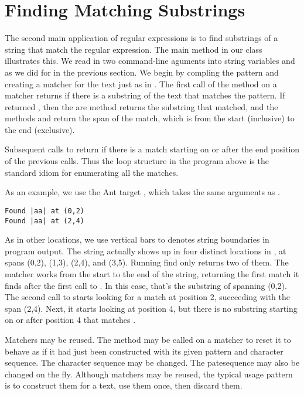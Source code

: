 \section{Finding Matching Substrings}

The second main application of regular expressions is to find
substrings of a string that match the regular expression.  The main
method in our class  illustrates this.  We read in two
command-line aguments into string variables  and 
as we did for  in the previous section.  We begin
by compling the pattern and creating a matcher for the text just
as in .
%
%
The first call of the  method on a matcher returns
 if there is a substring of the text that matches the
pattern.  If  returned , then the are method
 returns the substring that matched, and the methods
 and  return the span of the match, which is
from the start (inclusive) to the end (exclusive).

Subsequent calls to  return  if there is a
match starting on or after the end position of the previous calls.
Thus the loop structure in the program above is the standard idiom
for enumerating all the matches.  

As an example, we use the Ant target , which takes
the same arguments as .
%
%
\begin{verbatim}
Found |aa| at (0,2)
Found |aa| at (2,4)
\end{verbatim}
%
As in other locations, we use vertical bars to denotes string
boundaries in program output.  The string  actually
shows up in four distinct locations in , at
spans (0,2), (1,3), (2,4), and (3,5).  Running find only returns two
of them.  The matcher works from the start to the end of the string,
returning the first match it finds after the first call to
.  In this case, that's the substring of
 spanning (0,2).  The second call to
 starts looking for a match at position 2, succeeding
with the span (2,4).  Next, it starts looking at position 4, but there
is no substring starting on or after position 4 that matches
.

Matchers may be reused.  The method  may be called on a
matcher to reset it to behave as if it had just been constructed with
its given pattern and character sequence.  The character sequence may
be changed.  The patesequence may also be changed on the fly.  Although
matchers may be reused, the typical usage pattern is to construct them
for a text, use them once, then discard them.


